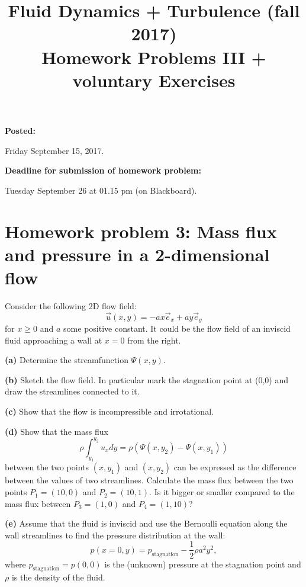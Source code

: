\documentclass[a4paper, 10pt]{article}
\title{Fluid Dynamics + Turbulence (fall 2017)\\Homework Problems III + voluntary Exercises}
\author{}
\date{}
\begin{document}
\maketitle

\large{
\textbf{Posted:}

Friday September 15, 2017.

\bigskip
\textbf{Deadline for submission of homework problem:}

Tuesday September 26 at 01.15 pm (on Blackboard).
}

\bigskip

\section*{Homework problem 3: Mass flux and pressure in a 2-dimensional flow}
Consider the following 2D flow field:
\begin{equation}
\vec{u}(x,y)=-ax\vec{e}_x+ay\vec{e}_y
\end{equation}
for $x\geq0$ and $a$ some positive constant. It could be the flow field of an inviscid fluid approaching a wall at $x=0$ from the right. \newline

{\bf (a)} Determine the streamfunction $\Psi(x,y)$.\newline

{\bf (b)} Sketch the flow field. In particular mark the stagnation point at (0,0) and draw the streamlines connected to it. \newline

{\bf (c)} Show that the flow is incompressible and irrotational. \newline

{\bf (d)} Show that the mass flux
\begin{equation}
\rho\int_{y_1}^{y_2} u_xdy=\rho(\Psi(x,y_2)-\Psi(x,y_1))
\end{equation}
between the two points $(x,y_1)$ and $(x,y_2)$ can be expressed as the difference between the values of two streamlines. Calculate the mass flux between the two points $P_1=(10,0)$ and $P_2=(10,1)$. Is it bigger or smaller compared to the mass flux between $P_3=(1,0)$ and $P_4=(1,10)$? \newline

{\bf (e)} Assume that the fluid is inviscid and use the Bernoulli equation along the wall streamlines to find the pressure distribution at the wall:
\begin{equation}
p(x=0,y) = p_\mathrm{stagnation}-\frac{1}{2}\rho a^2y^2,
\end{equation}
where $p_\mathrm{stagnation} = p(0,0)$ is the (unknown) pressure at the stagnation point and $\rho$ is the density of the fluid. \newline
\end{document}
